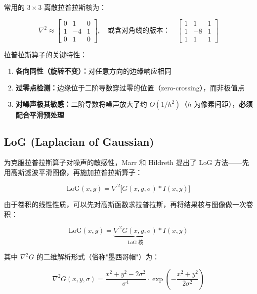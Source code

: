 \documentclass[12pt,a4paper]{ctexart}
\begin{document}
常用的 $3\times3$ 离散拉普拉斯核为：

\begin{equation}
    \nabla^2 \approx \begin{bmatrix}
        0 &  1 & 0 \\
        1 & -4 & 1 \\
        0 &  1 & 0
    \end{bmatrix},
    \quad \text{或含对角线的版本：} \quad
    \begin{bmatrix}
        1 &  1 & 1 \\
        1 & -8 & 1 \\
        1 &  1 & 1
    \end{bmatrix}
    \label{eq:lap_kernels}
\end{equation}

拉普拉斯算子的关键特性：
\begin{enumerate}[leftmargin=*]
    \item \textbf{各向同性（旋转不变）：}对任意方向的边缘响应相同
    \item \textbf{过零点检测：}边缘位于二阶导数穿过零的位置（zero-crossing），而非极值点
    \item \textbf{对噪声极其敏感：}二阶导数将噪声放大了约 $O(1/h^2)$（$h$ 为像素间距），\textbf{必须配合平滑预处理}
\end{enumerate}

\subsection{LoG (Laplacian of Gaussian)}

为克服拉普拉斯算子对噪声的敏感性，Marr 和 Hildreth 提出了 LoG 方法——先用高斯滤波平滑图像，再施加拉普拉斯算子：

\begin{equation}
    \text{LoG}(x,y) = \nabla^2 \big[ G(x,y,\sigma) * I(x,y) \big]
    \label{eq:log}
\end{equation}

由于卷积的线性性质，可以先对高斯函数求拉普拉斯，再将结果核与图像做一次卷积：

\begin{equation}
    \text{LoG}(x,y) = \underbrace{\nabla^2 G(x,y,\sigma)}_{\text{LoG 核}} * I(x,y)
    \label{eq:log_kernel}
\end{equation}

其中 $\nabla^2 G$ 的二维解析形式（俗称"墨西哥帽"）为：

\begin{equation}
    \nabla^2 G(x,y,\sigma) = \frac{x^2 + y^2 - 2\sigma^2}{\sigma^4} \cdot \exp\left(-\frac{x^2+y^2}{2\sigma^2}\right)
    \label{eq:mexican_hat}
\end{equation}
\end{document}
